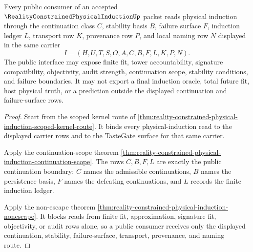 \begin{theorem}
\label{thm:reality-constrained-physical-induction-public-continuation-boundary}
Every public consumer of an accepted $\RealityConstrainedPhysicalInductionUp$ packet reads physical induction through the continuation class $C$, stability basis $B$, failure surface $F$, induction ledger $L$, transport row $K$, provenance row $P$, and local naming row $N$ displayed in the same carrier
$$
I=(H,U,T,S,O,A,C,B,F,L,K,P,N).
$$
The public interface may expose finite fit, tower accountability, signature compatibility, objectivity, audit strength, continuation scope, stability conditions, and failure boundaries. It may not export a final induction oracle, total future fit, host physical truth, or a prediction outside the displayed continuation and failure-surface rows.
\end{theorem}
\begin{proof}
Start from the scoped kernel route of \autoref{thm:reality-constrained-physical-induction-scoped-kernel-route}. It binds every physical-induction read to the displayed carrier rows and to the TasteGate surface for that same carrier.

Apply the continuation-scope theorem \autoref{thm:reality-constrained-physical-induction-continuation-scope}. The rows $C,B,F,L$ are exactly the public continuation boundary: $C$ names the admissible continuations, $B$ names the persistence basis, $F$ names the defeating continuations, and $L$ records the finite induction ledger.

Apply the non-escape theorem \autoref{thm:reality-constrained-physical-induction-nonescape}. It blocks reads from finite fit, approximation, signature fit, objectivity, or audit rows alone, so a public consumer receives only the displayed continuation, stability, failure-surface, transport, provenance, and naming route.
\end{proof}



